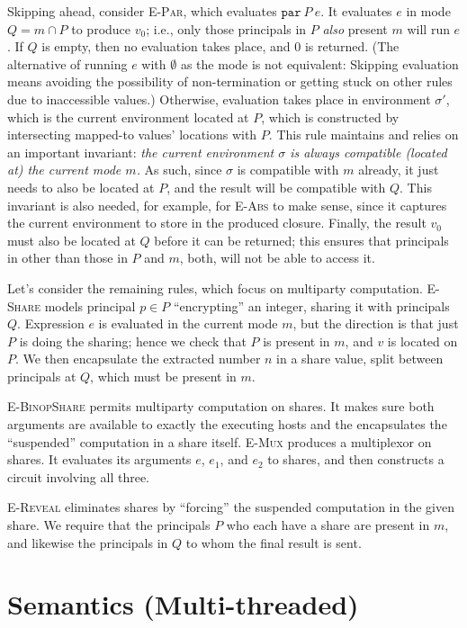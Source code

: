 \documentclass[10pt]{article}
\newcommand{\rulelab}[1]{{\small \textsc{#1}}}
\newcommand{\kw}[1]{\ensuremath{\mathtt{#1}}}
\newcommand{\epar}[2]{\ensuremath{\kw{par}~{#1}~{#2}}}
\begin{document}
Skipping ahead, consider \rulelab{E-Par}, which evaluates
$\epar{P}{e}$. It evaluates $e$ in mode $Q = m \cap P$ to produce
$v_0$; i.e., only those principals in $P$ \emph{also} present $m$ will
run $e$. If $Q$ is empty, then no evaluation takes place, and $0$ is
returned. (The alternative of running $e$ with $\emptyset$ as the mode
is not equivalent: Skipping evaluation means avoiding the possibility
of non-termination or getting stuck on other rules due to inaccessible
values.) Otherwise, evaluation takes place in environment $\sigma'$,
which is the current environment located at $P$, which is constructed
by intersecting mapped-to values' locations with $P$. This rule
maintains and relies on an important invariant: \emph{the current
  environment $\sigma$ is always compatible (located at) the current
  mode $m$.} As such, since $\sigma$ is compatible with $m$ already,
it just needs to also be located at $P$, and the result will be
compatible with $Q$. This invariant is also needed, for example, for
\rulelab{E-Abs} to make sense, since it captures the current
environment to store in the produced closure. Finally, the result
$v_0$ must also be located at $Q$ before it can be returned; this
ensures that principals in other than those in $P$ and $m$, both, will
not be able to access it.

Let's consider the remaining rules, which focus on multiparty
computation. \rulelab{E-Share} models principal $p \in P$
``encrypting'' an integer, sharing it with principals $Q$. Expression
$e$ is evaluated in the current mode $m$, but the direction is that
just $P$ is doing the sharing; hence we check that $P$ is present in
$m$, and $v$ is located
on $P$. We then encapsulate the extracted number $n$ in a share value,
split between principals at $Q$, which must be present in $m$.

\rulelab{E-BinopShare} permits multiparty computation on shares. It
makes sure both arguments are available to exactly the executing hosts
and the encapsulates the ``suspended'' computation in a share
itself. \rulelab{E-Mux} produces a multiplexor on shares. It evaluates
its arguments $e$, $e_1$, and $e_2$ to shares, and then constructs a
circuit involving all three.

\rulelab{E-Reveal} eliminates shares by ``forcing'' the suspended
computation in the given share. We require that the principals $P$ who
each have a share are present in $m$, and likewise the principals in
$Q$ to whom the final result is sent.

\section{Semantics (Multi-threaded)}
\end{document}
